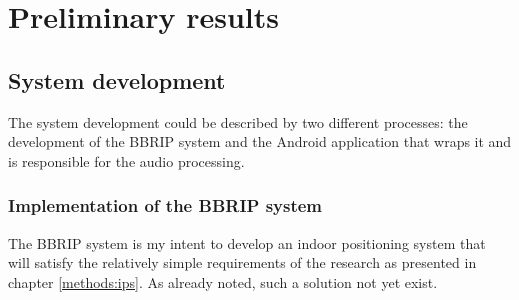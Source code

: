\documentclass[a4paper,11pt]{article}
\begin{document}
\section{Preliminary results}

\subsection{System development}

The system development could be described by two different processes: the development of the BBRIP system and the Android application that wraps it and is responsible for the audio processing.

\subsubsection{Implementation of the BBRIP system}

The BBRIP system is my intent to develop an indoor positioning system that will satisfy the relatively simple requirements of the research as presented in chapter \ref{methods:ips}.
As already noted, such a solution not yet exist.
\end{document}
